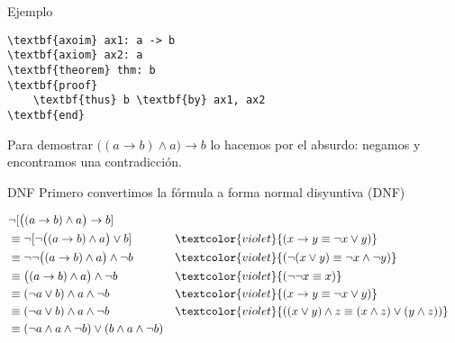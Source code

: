 \documentclass{beamer}
\begin{document}
\begin{frame}[fragile]{Ejemplo}
\begin{block}{}
\begin{Verbatim}[commandchars=\\\{\}]
\textbf{axoim} ax1: a -> b
\textbf{axiom} ax2: a
\textbf{theorem} thm: b
\textbf{proof}
    \textbf{thus} b \textbf{by} ax1, ax2
\textbf{end}
\end{Verbatim}    
\end{block}

Para demostrar $\big( (a \to b) \wedge a \big) \to b$ lo hacemos por el absurdo: negamos y encontramos una contradicción.
\end{frame}

\begin{frame}[fragile]{DNF}
Primero convertimos la fórmula a forma normal disyuntiva (DNF)

\newcommand{\just}[1]{\textcolor{violet}{(#1)}}

\begin{align*}
    &\neg [ \big( (a \to b) \wedge a \big) \to b ] \\
    &\equiv \neg [ \neg \big( (a \to b) \wedge a \big) \vee b ]
        && \just{x \to y \equiv \neg x \vee y}\\
    &\equiv \neg \neg \big( (a \to b) \wedge a \big) \wedge \neg b
        && \just{\neg(x \vee y) \equiv \neg x \wedge \neg y}\\
    &\equiv \big( (a \to b) \wedge a \big) \wedge \neg b
        && \just{\neg\neg x \equiv x}\\
    &\equiv (\neg a \vee b) \wedge a \wedge \neg b
         && \just{x \to y \equiv \neg x \vee y}\\
    &\equiv (\neg a \vee b) \wedge a \wedge \neg b
        && \just{(x \vee y) \wedge z \equiv (x \wedge z) \vee (y \wedge z) }\\
    &\equiv
        (\neg a \wedge a \wedge \neg b)
        \vee
        (b \wedge a \wedge \neg b)
\end{align*}
\end{frame}
\end{document}
